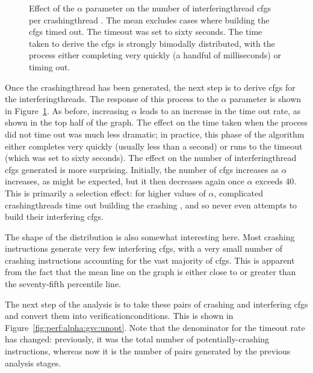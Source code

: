 
\begin{figure}
  
  \caption{Effect of the $\alpha$ parameter on the number of
    \gls{interferingthread} \glspl{cfg} per \gls{crashingthread}
        {\StateMachine}.  The mean excludes cases where building the
        \glspl{cfg} timed out.  The timeout was set to sixty seconds.
        The time taken to derive the \glspl{cfg} is strongly bimodally
        distributed, with the process either completing very quickly
        (a handful of milliseconds) or timing out.}
  \label{fig:perf:alpha:gsc:unopt}
\end{figure}

Once the \gls{crashingthread} {\StateMachine} has been generated, the
next step is to derive \glspl{cfg} for the \glspl{interferingthread}.
The response of this process to the $\alpha$ parameter is shown in
Figure~\ref{fig:perf:alpha:gsc:unopt}.  As before, increasing $\alpha$
leads to an increase in the time out rate, as shown in the top half of
the graph.  The effect on the time taken when the process did not time
out was much less dramatic; in practice, this phase of the algorithm
either completes very quickly (usually less than a second) or runs to
the timeout (which was set to sixty seconds).  The effect on the
number of \gls{interferingthread} \glspl{cfg} generated is more
surprising.  Initially, the number of \glspl{cfg} increases as
$\alpha$ increases, as might be expected, but it then decreases again
once $\alpha$ exceeds 40.  This is primarily a selection effect: for
higher values of $\alpha$, complicated \glspl{crashingthread} time out
building the crashing {\StateMachine}, and so {\implementation} never
even attempts to build their interfering \glspl{cfg}.

The shape of the distribution is also somewhat interesting here.  Most
crashing instructions generate very few interfering \glspl{cfg}, with
a very small number of crashing instructions accounting for the vast
majority of \glspl{cfg}.  This is apparent from the fact that the mean
line on the graph is either close to or greater than the seventy-fifth
percentile line.

The next step of the analysis is to take these pairs of crashing
{\StateMachines} and interfering \glspl{cfg} and convert them into
\glspl{verificationcondition}.  This is shown in
Figure~\ref{fig:perf:alpha:gvc:unopt}.  Note that the denominator for
the timeout rate has changed: previously, it was the total number of
potentially-crashing instructions, whereas now it is the number of
pairs generated by the previous analysis stages.

